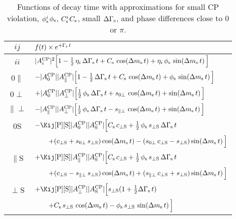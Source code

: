 \begin{table}[tbp]
  \centering
  \caption{Functions of decay time with approximations for small CP violation, $\phi_\text{s}^{i}$\textequiv$\phi_\text{s}$, $C_\text{s}^{i}$\texteq$C_\text{s}$,
           small $\Delta\Gamma_\text{s}$, and phase differences close to 0 or $\pi$.}
  \label{tab:timeFunctionsApproxEqual}
  \renewcommand{\arraystretch}{1.7}
  \begin{tabular}{cl}
    \hline
    $ij$  &  $f(t) \times e^{+\Gamma_\text{s}\,t}$  \\
    \hline
    $ii$
      &  $|A_{i}^{\text{CP}}|^2 \Big[
                     1 - \tfrac{1}{2}\,\eta_i\,\Delta\Gamma_\text{s}\,t
                     + C_\text{s}\,\cos\!\left(\Delta m_\text{s}\, t\right) + \eta_i\,\phi_\text{s}\,\sin\!\left(\Delta m_\text{s}\, t\right)
                   \Big]$  \\
    0$\parallel$
      &  $-|A_{\text{0}}^{\text{CP}}||A_{\parallel}^{\text{CP}}| \Big[
                                 1 - \tfrac{1}{2}\,\Delta\Gamma_\text{s}\,t
                                 + C_\text{s}\, \cos\!\left(\Delta m_\text{s}\, t\right) + \phi_\text{s}\, \sin\!\left(\Delta m_\text{s}\, t\right)
                               \Big]$  \\
    0$\perp$
      &  $+|A_{\text{0}}^{\text{CP}}||A_{\perp}^{\text{CP}}| \Big[
                                  \tfrac{1}{2}\,\phi_\text{s}\,\Delta\Gamma_\text{s}\,t
                                  + s_{\text{0}\perp}\, \cos\!\left(\Delta m_\text{s}\, t\right) + \sin\!\left(\Delta m_\text{s}\, t\right)
                                \Big]$  \\
    $\parallel\perp$
      &  $-|A_{\parallel}^{\text{CP}}||A_{\perp}^{\text{CP}}| \Big[
                                 \tfrac{1}{2}\,\phi_\text{s}\,\Delta\Gamma_\text{s}\,t
                                 - s_{\parallel\perp}\, \cos\!\left(\Delta m_\text{s}\, t\right) + \sin\!\left(\Delta m_\text{s}\, t\right)
                               \Big]$  \\
    0S
      &  $-\CSP\magzeroAv\magSAv \Big[
                                   \Cs\,\cperpS
                                   + \tfrac{1}{2}\,\phis\,\sperpS\,\DGs\,t$ \\
      &  $\qquad                   + (c_{\perp\text{S}} + s_{\text{0}\perp}\,s_{\perp\text{S}}) \cos\!\left(\Delta m_\text{s}\, t\right)
                                   - (s_{\text{0}\perp}\,c_{\perp\text{S}} - s_{\perp\text{S}})\sin\!\left(\Delta m_\text{s}\, t\right)
                                 \Big]$  \\
    $\parallel$S
      &  $+\CSP\magparAv\magSAv \Big[
                                  \Cs\,\cperpS
                                  + \tfrac{1}{2}\,\phis\,\sperpS\,\DGs\,t$ \\
      &  $\qquad                  + (c_{\perp\text{S}} - s_{\parallel\perp}\,s_{\perp\text{S}})\cos\!\left(\Delta m_\text{s}\, t\right)
                                  + (s_{\parallel\perp}\,c_{\perp\text{S}} + s_{\perp\text{S}})\sin\!\left(\Delta m_\text{s}\, t\right)
                                \Big]$  \\
    $\perp$S
      &  $+\CSP\magperpAv\magSAv \Big[
                                   \sperpS (1 + \tfrac{1}{2}\DGs\,t)$ \\
      &  $\qquad                   + C_\text{s}\,s_{\perp\text{S}}\,\cos\!\left(\Delta m_\text{s}\, t\right)
                                   - \phi_\text{s}\,s_{\perp\text{S}}\,\sin\!\left(\Delta m_\text{s}\, t\right)
                                 \Big]$  \\
    \hline
  \end{tabular}
\end{table}

